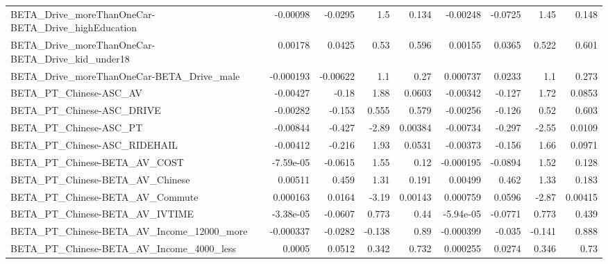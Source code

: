 \begin{tabular}{lrrrrrrrr}
BETA\_Drive\_moreThanOneCar-BETA\_Drive\_highEducation &    -0.00098 &      -0.0295 &      1.5 &    0.134 &   -0.00248 &     -0.0725 &         1.45 &         0.148 \\
BETA\_Drive\_moreThanOneCar-BETA\_Drive\_kid\_under18   &     0.00178 &       0.0425 &     0.53 &    0.596 &    0.00155 &      0.0365 &        0.522 &         0.601 \\
BETA\_Drive\_moreThanOneCar-BETA\_Drive\_male          &   -0.000193 &     -0.00622 &      1.1 &     0.27 &   0.000737 &      0.0233 &          1.1 &         0.273 \\
BETA\_PT\_Chinese-ASC\_AV                             &    -0.00427 &        -0.18 &     1.88 &   0.0603 &   -0.00342 &      -0.127 &         1.72 &        0.0853 \\
BETA\_PT\_Chinese-ASC\_DRIVE                          &    -0.00282 &       -0.153 &    0.555 &    0.579 &   -0.00256 &      -0.126 &         0.52 &         0.603 \\
BETA\_PT\_Chinese-ASC\_PT                             &    -0.00844 &       -0.427 &    -2.89 &  0.00384 &   -0.00734 &      -0.297 &        -2.55 &        0.0109 \\
BETA\_PT\_Chinese-ASC\_RIDEHAIL                       &    -0.00412 &       -0.216 &     1.93 &   0.0531 &   -0.00373 &      -0.156 &         1.66 &        0.0971 \\
BETA\_PT\_Chinese-BETA\_AV\_COST                       &   -7.59e-05 &      -0.0615 &     1.55 &     0.12 &  -0.000195 &     -0.0894 &         1.52 &         0.128 \\
BETA\_PT\_Chinese-BETA\_AV\_Chinese                    &     0.00511 &        0.459 &     1.31 &    0.191 &    0.00499 &       0.462 &         1.33 &         0.183 \\
BETA\_PT\_Chinese-BETA\_AV\_Commute                    &    0.000163 &       0.0164 &    -3.19 &  0.00143 &   0.000759 &      0.0596 &        -2.87 &       0.00415 \\
BETA\_PT\_Chinese-BETA\_AV\_IVTIME                     &   -3.38e-05 &      -0.0607 &    0.773 &     0.44 &  -5.94e-05 &     -0.0771 &        0.773 &         0.439 \\
BETA\_PT\_Chinese-BETA\_AV\_Income\_12000\_more          &   -0.000337 &      -0.0282 &   -0.138 &     0.89 &  -0.000399 &      -0.035 &       -0.141 &         0.888 \\
BETA\_PT\_Chinese-BETA\_AV\_Income\_4000\_less           &      0.0005 &       0.0512 &    0.342 &    0.732 &   0.000255 &      0.0274 &        0.346 &          0.73 \\

\end{tabular}
